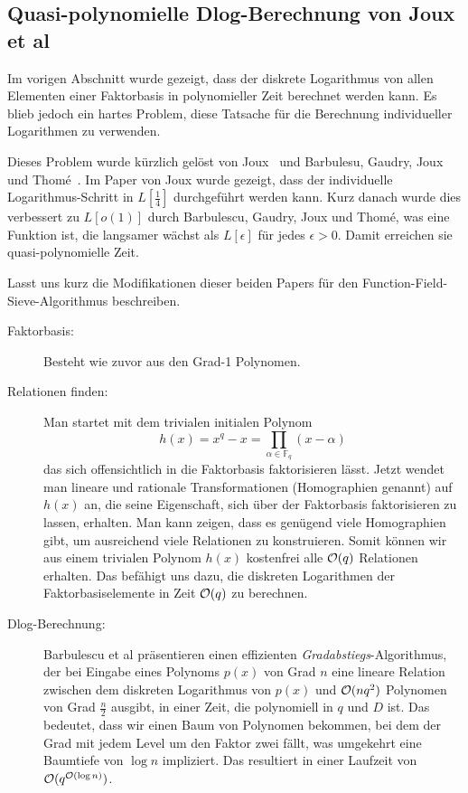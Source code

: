 \begin{refsegment}
\subsection{Quasi-polynomielle Dlog-Berechnung von Joux et al}

Im vorigen Abschnitt wurde gezeigt, dass der diskrete Logarithmus von allen Elementen einer Faktorbasis in polynomieller Zeit berechnet werden kann. Es blieb jedoch ein hartes Problem, diese Tatsache für die Berechnung individueller Logarithmen zu verwenden.

Dieses Problem wurde kürzlich gelöst von Joux~\cite{Joux2013} und Barbulesu, Gaudry, Joux und Thom\'e~\cite{BGJT2013}. Im Paper von Joux wurde gezeigt, dass der individuelle Logarithmus-Schritt in $L[\frac 1 4]$ durchgeführt werden kann. Kurz danach wurde dies verbessert zu $L[o(1)]$ durch Barbulescu, Gaudry, Joux und Thom\'e, was eine Funktion ist, die langsamer wächst als $L[\epsilon]$ für jedes $\epsilon > 0$. Damit erreichen sie quasi-polynomielle Zeit.

Lasst uns kurz die Modifikationen dieser beiden Papers für den Function-Field-Sieve-Algo\-rith\-mus beschreiben.


\begin{description}
\item[Faktorbasis:] Besteht wie zuvor aus den Grad-1 Polynomen.
\item[Relationen finden:] Man startet mit dem trivialen initialen Polynom
$$
  h(x)= x^q-x = \prod_{\alpha \in \mathbb{F}_q} (x-\alpha)
$$
das sich offensichtlich in die Faktorbasis faktorisieren lässt. Jetzt wendet man lineare und rationale Transformationen (Homographien genannt) auf $h(x)$ an, die seine Eigenschaft, sich über der Faktorbasis faktorisieren zu lassen, erhalten. Man kann zeigen, dass es genügend viele Homographien gibt, um ausreichend viele Relationen zu konstruieren. Somit können wir aus einem trivialen Polynom $h(x)$ kostenfrei alle ${\cal O}(q)$ Relationen erhalten. Das befähigt uns dazu, die diskreten Logarithmen der Faktorbasiselemente in Zeit ${\cal O}(q)$ zu berechnen.
\item[Dlog-Berechnung:] Barbulescu et al präsentieren einen effizienten {\em Gradabstiegs}-Algorithmus, der bei Eingabe eines Polynoms $p(x)$ von Grad $n$ eine lineare Relation zwischen dem diskreten Logarithmus von $p(x)$ und ${\cal O}(nq^2)$ Polynomen von Grad $\frac n 2$ ausgibt, in einer Zeit, die polynomiell in $q$ und $D$ ist. Das bedeutet, dass wir einen Baum von Polynomen bekommen, bei dem der Grad mit jedem Level um den Faktor zwei fällt, was umgekehrt eine Baumtiefe von $\log n$ impliziert. Das resultiert in einer Laufzeit von ${\cal O}(q^{{\cal O}(\log n)})$.
\end{description}


\end{refsegment}
